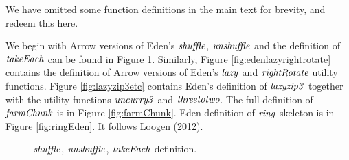 \documentclass[paper=A4,twoside=true,openright,parskip=full,chapterprefix=true,headings=normal,bibliography=totoc,listof=totoc,titlepage=on,captions=tableabove,draft=false,british]{scrreprt}%
\begin{document}
\label{app:omitted}

We have omitted some function definitions in the main text for brevity,
and redeem this here.

We begin with Arrow versions of Eden's \ensuremath{\Varid{shuffle}}, \ensuremath{\Varid{unshuffle}} and the
definition of \ensuremath{\Varid{takeEach}} can be found in Figure
\ref{fig:edenshuffleetc}. Similarly, Figure
\ref{fig:edenlazyrightrotate} contains the definition of Arrow versions
of Eden's \ensuremath{\Varid{lazy}} and \ensuremath{\Varid{rightRotate}} utility functions. Figure
\ref{fig:lazyzip3etc} contains Eden's definition of \ensuremath{\Varid{lazyzip3}} together
with the utility functions \ensuremath{\Varid{uncurry3}} and \ensuremath{\Varid{threetotwo}}. The full
definition of \ensuremath{\Varid{farmChunk}} is in Figure \ref{fig:farmChunk}. Eden
definition of \ensuremath{\Varid{ring}} skeleton is in Figure \ref{fig:ringEden}. It
follows Loogen (\protect\hyperlink{ref-Loogen2012}{2012}).

\begin{figure}[t]
\centering
{}\resethooks
\caption{\ensuremath{\Varid{shuffle}}, \ensuremath{\Varid{unshuffle}}, \ensuremath{\Varid{takeEach}} definition.}\label{fig:edenshuffleetc}\end{figure}
\end{document}
